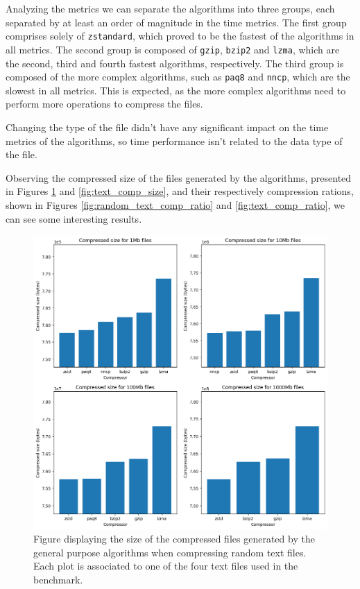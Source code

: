         Analyzing the metrics we can separate the algorithms into three groups, each separated by at least an order of magnitude in the time metrics.
        The first group comprises solely of \texttt{zstandard}, which proved to be the fastest of the algorithms in all metrics. The second group is composed of \texttt{gzip}, \texttt{bzip2} and \texttt{lzma}, which are the second, third and fourth fastest algorithms, respectively. The third group is composed of the more complex algorithms, such as \texttt{paq8} and \texttt{nncp}, which are the slowest in all metrics. This is expected, as the more complex algorithms need to perform more operations to compress the files.
        
        Changing the type of the file didn't have any significant impact on the time metrics of the algorithms, so time performance isn't related to the data type of the file.

        Observing the compressed size of the files generated by the algorithms, presented in Figures \ref{fig:random_text_comp_size} and \ref{fig:text_comp_size}, and their respectively compression rations, shown in Figures \ref{fig:random_text_comp_ratio} and \ref{fig:text_comp_ratio}, we can see some interesting results. 

        \begin{figure}
            \centering
            \includegraphics[width=1\textwidth]{figs/random_text_comp_size.png}
            \caption[Figure displaying the size of the compressed files generated by the general purpose algorithms when compressing random text files.] {Figure displaying the size of the compressed files generated by the general purpose algorithms when compressing random text files. Each plot is associated to one of the four text files used in the benchmark.}
            \label{fig:random_text_comp_size}
        \end{figure}

